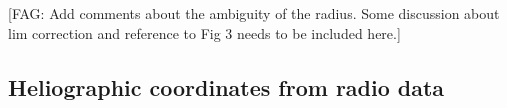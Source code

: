 \documentclass{aa}
\newcommand{\fag}[1]{\textcolor{midpurple}{[FAG: #1]}} %
\begin{document}
  
%
%
%
\fag{Add comments about the ambiguity of the radius.
 Some discussion about lim correction and reference to Fig 3 needs to be included here.}
\subsection{Heliographic coordinates from radio data}\label{sect:helio}
\end{document}
